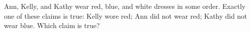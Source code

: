 Ann, Kelly, and Kathy wear red, blue, and white dresses in some order. Exactly one of these claims is true: Kelly wore red; Ann did not wear red; Kathy did not wear blue. Which claim is true?
